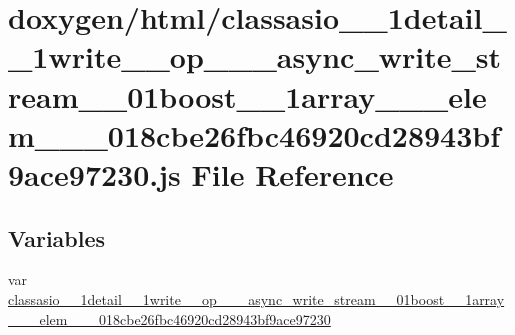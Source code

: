 \hypertarget{classasio__1__1detail__1__1write____op__3__01__async__write__stream__00__01boost__1__1array__3__74a0e266dbec84005e1ff5344d6adfde}{}\section{doxygen/html/classasio\+\_\+\_\+1detail\+\_\+\_\+1write\+\_\+\+\_\+op\+\_\+\_\+\_\+async\+\_\+write\+\_\+stream\+\_\+\_\+01boost\+\_\+\_\+1array\+\_\+\_\+\_\+elem\+\_\+\_\+\_\+018cbe26fbc46920cd28943bf9ace97230.js File Reference}
\label{classasio__1__1detail__1__1write____op__3__01__async__write__stream__00__01boost__1__1array__3__74a0e266dbec84005e1ff5344d6adfde}
\subsection*{Variables}
\begin{DoxyCompactItemize}
\item 
var \hyperlink{classasio__1__1detail__1__1write____op__3__01__async__write__stream__00__01boost__1__1array__3__74a0e266dbec84005e1ff5344d6adfde_aa62f417527082ec240f5ef9faa6b9c80}{classasio\+\_\+\_\+1detail\+\_\+\_\+1write\+\_\+\+\_\+op\+\_\+\_\+\_\+async\+\_\+write\+\_\+stream\+\_\+\_\+01boost\+\_\+\_\+1array\+\_\+\_\+\_\+elem\+\_\+\_\+\_\+018cbe26fbc46920cd28943bf9ace97230}
\end{DoxyCompactItemize}


